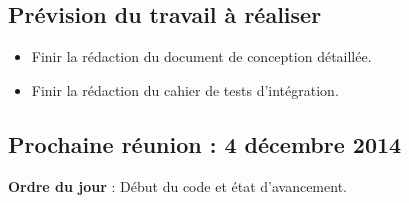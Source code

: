 \documentclass[12pt,a4paper]{article}
\begin{document}
\subsection*{Prévision du travail à réaliser}

\begin{itemize}[label = $\ast$]
	\item Finir la rédaction du document de conception détaillée.
	\item Finir la rédaction du cahier de tests d'intégration.
\end{itemize}

\subsection*{Prochaine réunion : 4 décembre 2014}

\textbf{Ordre du jour} : Début du code et état d'avancement.\\
\end{document}
